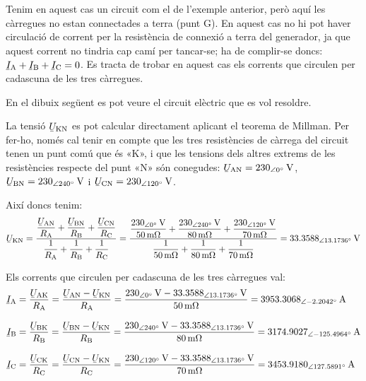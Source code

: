 \begin{exemple}
    Tenim en aquest cas un circuit com el de l'exemple anterior, però aquí les càrregues no estan connectades a terra (punt G). En aquest cas no hi pot haver circulació de corrent per la resistència de connexió a terra del generador, ja que aquest corrent no tindria cap camí per tancar-se; ha de complir-se doncs: $\cmplx{I}\ped{A} + \cmplx{I}\ped{B} + \cmplx{I}\ped{C} = 0$. Es tracta de trobar en aquest cas els corrents que circulen per cadascuna de les tres càrregues.

    En el dibuix següent es pot veure el circuit elèctric que es vol resoldre.

    \begin{center}
        
    \end{center}

    La tensió $\cmplx{U}\ped{KN}$ es pot calcular directament aplicant el teorema de Millman. Per fer-ho, només cal tenir en compte que les tres resistències de càrrega del circuit tenen un punt comú que és «K», i que les tensions dels altres extrems de les resistències respecte del punt «N» són conegudes: $\cmplx{U}\ped{AN}=\SIpd{230}{0}{V}$, $\cmplx{U}\ped{BN}=\SIpd{230}{240}{V}$ i $\cmplx{U}\ped{CN}=\SIpd{230}{120}{V}$.

    Així doncs tenim:
    \[
    \cmplx{U}\ped{KN} = \frac{ \dfrac{\cmplx{U}\ped{AN}}{R\ped{A}} + \dfrac{\cmplx{U}\ped{BN}}{R\ped{B}} + \dfrac{\cmplx{U}\ped{CN}}{R\ped{C}}} { \dfrac{1}{R\ped{A}} + \dfrac{1}{R\ped{B}} + \dfrac{1}{R\ped{C}}} =
    \frac{\dfrac{\SIpd{230}{0}{V}}{\SI{50}{m\ohm}}+\dfrac{\SIpd{230}{240}{V}}{\SI{80}{m\ohm}}+
    \dfrac{\SIpd{230}{120}{V}}{\SI{70}{m\ohm}}}{\dfrac{1}{\SI{50}{m\ohm}}+\dfrac{1}{\SI{80}{m\ohm}}+
    \dfrac{1}{\SI{70}{m\ohm}}} =
    \SIpd{33,3588}{13,1736}{V}
    \]


    Els corrents que circulen per cadascuna de les tres càrregues val:
    \begin{align*}
    \cmplx{I}\ped{A} &= \frac{\cmplx{U}\ped{AK}}{R\ped{A}} = \frac{\cmplx{U}\ped{AN} - \cmplx{U}\ped{KN}}{R\ped{A}} = \frac{\SIpd{230}{0}{V}-\SIpd{33,3588}{13,1736}{V}}{\SI{50}{m\ohm}}
    = \SIpd{3953,3068}{-2,2042}{A}\\[2ex]
    \cmplx{I}\ped{B} &= \frac{\cmplx{U}\ped{BK}}{R\ped{B}} = \frac{\cmplx{U}\ped{BN} - \cmplx{U}\ped{KN}}{R\ped{B}} = \frac{\SIpd{230}{240}{V}-\SIpd{33,3588}{13,1736}{V}}{\SI{80}{m\ohm}}
    = \SIpd{3174,9027}{-125,4964}{A}\\[2ex]
    \cmplx{I}\ped{C} &= \frac{\cmplx{U}\ped{CK}}{R\ped{C}} = \frac{\cmplx{U}\ped{CN} - \cmplx{U}\ped{KN}}{R\ped{C}} = \frac{\SIpd{230}{120}{V}-\SIpd{33,3588}{13,1736}{V}}{\SI{70}{m\ohm}}
    = \SIpd{3453,9180}{127,5891}{A}
    \end{align*}
\end{exemple}


